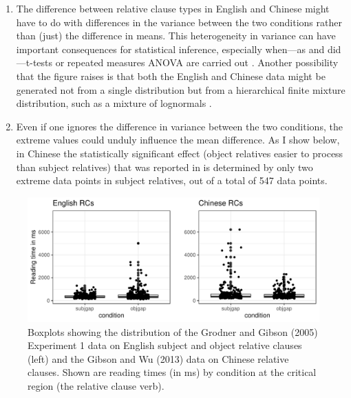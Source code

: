 \documentclass{ar-1col}\usepackage[]{graphicx}\usepackage[]{color}
\makeatletter
\def\maxwidth{ %
  \ifdim\Gin@nat@width>\linewidth
    \linewidth
  \else
    \Gin@nat@width
  \fi
}
\newenvironment{knitrout}{}{} %
\makeatother
\begin{document}
\begin{enumerate}
\item The difference between relative clause types in English and Chinese might have to do with differences in the variance between the two conditions rather than (just) the difference in means. This heterogeneity in variance can have important consequences for statistical inference, especially when---as \citet{grodner} and  \citet{gibsonwu} did---t-tests or repeated measures ANOVA are carried out \citep{SchadEtAlAggregation2022}. Another possibility that the figure raises is that both the English and Chinese data might be generated not from a single distribution but from a hierarchical finite mixture distribution, such as a mixture of lognormals \citep{VasishthChopinRyderNicenboimCogSci2017}.
\item Even if one ignores the difference in variance between the two conditions, the extreme values could unduly influence the mean difference. As I show below, in Chinese the statistically significant effect (object relatives easier to process than subject relatives) that was reported in \citet{gibsonwu}  is determined by only two extreme data points in subject relatives,  out of a total of 547 data points.
\end{enumerate}


\begin{figure}[!htbp]
\centering
\begin{knitrout}
\color{fgcolor}

{\centering \includegraphics[width=\maxwidth]{figures/fig-unnamed-chunk-13-1} 

}


\end{knitrout}
\caption{Boxplots showing the distribution of the Grodner and Gibson (2005) Experiment 1 data on English subject and object relative clauses (left) and the Gibson and Wu (2013) data on Chinese relative clauses. Shown are reading times (in ms) by condition at the critical region (the relative clause verb).}\label{fig:boxplot}
\end{figure}
\end{document}
